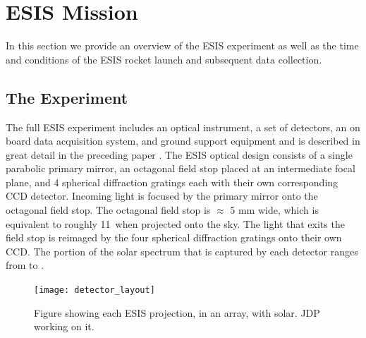 \section{ESIS Mission}

In this section we provide an overview of the ESIS experiment as well as the time and conditions of the ESIS rocket launch and subsequent data collection.   

	\subsection{The Experiment}
	  	
    	The full ESIS experiment includes an optical instrument, a set of detectors, an on board data acquisition system, and ground support equipment and is described in great detail in the preceding paper \citep{ESIS}.
    	The ESIS optical design consists of a single parabolic primary mirror, an octagonal field stop placed at an intermediate focal plane, and 4 spherical diffraction gratings each with their own corresponding CCD detector.
    	Incoming light is focused by the primary mirror onto the octagonal field stop. 
    	The octagonal field stop is $\approx$ 5 mm wide, which is equivalent to roughly 11\arcmin \  when projected onto the sky. 
    	The light that exits the field stop is reimaged  by the four spherical diffraction gratings onto their own CCD.
    	The portion of the solar spectrum that is captured by each detector ranges from \hei to \ov.
    	
    	
        \begin{figure}[ht]
			\begin{center}
				\texttt{[image: detector\_layout]}
				\caption{Figure showing each ESIS projection, in an array, with solar.  JDP working on it.  }
				\label{fig:level_1_array}
			\end{center}
		\end{figure}


